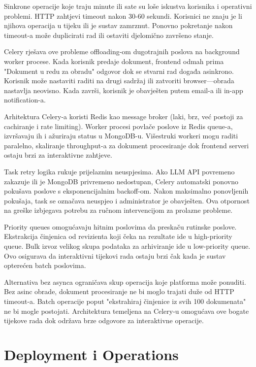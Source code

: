 \documentclass[12pt,a4paper]{article}
\begin{document}
Sinkrone operacije koje traju minute ili sate su loše iskustva korisnika i operativni problemi. HTTP zahtjevi timeout nakon 30-60 sekundi. Korisnici ne znaju je li njihova operacija u tijeku ili je sustav zamrznut. Ponovno pokretanje nakon timeout-a može duplicirati rad ili ostaviti djelomično završeno stanje.

Celery rješava ove probleme offloading-om dugotrajnih poslova na background worker procese. Kada korisnik predaje dokument, frontend odmah prima "Dokument u redu za obradu" odgovor dok se stvarni rad događa asinkrono. Korisnik može nastaviti raditi na drugi sadržaj ili zatvoriti browser—obrada nastavlja neovisno. Kada završi, korisnik je obavješten putem email-a ili in-app notification-a.

Arhitektura Celery-a koristi Redis kao message broker (laki, brz, već postoji za cachiranje i rate limiting). Worker procesi povlače poslove iz Redis queue-a, izvršavaju ih i ažuriraju status u MongoDB-u. Višestruki workeri mogu raditi paralelno, skaliranje throughput-a za dokument procesiranje dok frontend serveri ostaju brzi za interaktivne zahtjeve.

Task retry logika rukuje prijelaznim neuspjesima. Ako LLM API povremeno zakazuje ili je MongoDB privremeno nedostupan, Celery automatski ponovno pokušava poslove s eksponencijalnim backoff-om. Nakon maksimalno ponovljenih pokušaja, task se označava neuspjeo i administrator je obavješten. Ova otpornost na greške izbjegava potrebu za ručnom intervencijom za prolazne probleme.

Priority queues omogućavaju hitnim poslovima da preskaču rutinske poslove. Ekstrakcija činjenica od revizienta koji čeka na rezultate ide u high-priority queue. Bulk izvoz velikog skupa podataka za arhiviranje ide u low-priority queue. Ovo osigurava da interaktivni tijekovi rada ostaju brzi čak kada je sustav opterećen batch poslovima.

Alternativa bez asynca ograničava skup operacija koje platforma može ponuditi. Bez asinc obrade, dokument procesiranje ne bi moglo trajati duže od HTTP timeout-a. Batch operacije poput "ekstrahiraj činjenice iz svih 100 dokumenata" ne bi mogle postojati. Architektura temeljena na Celery-u omogućava ove bogate tijekove rada dok održava brze odgovore za interaktivne operacije.

\section{Deployment i Operations}
\end{document}

